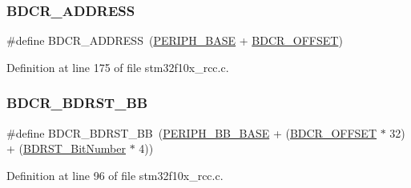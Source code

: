 \subsubsection{\texorpdfstring{B\+D\+C\+R\+\_\+\+A\+D\+D\+R\+E\+SS}{BDCR\_ADDRESS}}
{\footnotesize\ttfamily \#define B\+D\+C\+R\+\_\+\+A\+D\+D\+R\+E\+SS~(\hyperlink{group___peripheral__memory__map_ga9171f49478fa86d932f89e78e73b88b0}{P\+E\+R\+I\+P\+H\+\_\+\+B\+A\+SE} + \hyperlink{group___r_c_c___private___defines_ga5f8a0c3cb5f5c835bf7eef09515138ad}{B\+D\+C\+R\+\_\+\+O\+F\+F\+S\+ET})}



Definition at line 175 of file stm32f10x\+\_\+rcc.\+c.

\mbox{\label{group___r_c_c___private___defines_ga892fdf297b85b85cbaf0723649b31818}} 
\subsubsection{\texorpdfstring{B\+D\+C\+R\+\_\+\+B\+D\+R\+S\+T\+\_\+\+BB}{BDCR\_BDRST\_BB}}
{\footnotesize\ttfamily \#define B\+D\+C\+R\+\_\+\+B\+D\+R\+S\+T\+\_\+\+BB~(\hyperlink{group___peripheral__memory__map_gaed7efc100877000845c236ccdc9e144a}{P\+E\+R\+I\+P\+H\+\_\+\+B\+B\+\_\+\+B\+A\+SE} + (\hyperlink{group___r_c_c___private___defines_ga5f8a0c3cb5f5c835bf7eef09515138ad}{B\+D\+C\+R\+\_\+\+O\+F\+F\+S\+ET} $\ast$ 32) + (\hyperlink{group___r_c_c___private___defines_gae6718158034388d8fde8caaa28ffe8b9}{B\+D\+R\+S\+T\+\_\+\+Bit\+Number} $\ast$ 4))}



Definition at line 96 of file stm32f10x\+\_\+rcc.\+c.

\mbox{\label{group___r_c_c___private___defines_ga5f8a0c3cb5f5c835bf7eef09515138ad}} 
